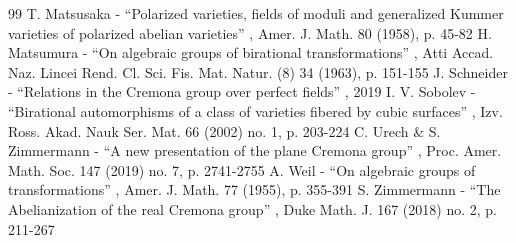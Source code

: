 \documentclass[11pt]{article}
\numberwithin{equation}{section}
\begin{document}
\begin{thebibliography}{99}
 T. Matsusaka - “Polarized varieties, fields of moduli and generalized Kummer varieties of polarized abelian varieties” , Amer. J. Math. 80 (1958), p. 45-82
 H. Matsumura - “On algebraic groups of birational transformations” , Atti Accad. Naz. Lincei Rend. Cl. Sci. Fis. Mat. Natur. (8) 34 (1963), p. 151-155
 J. Schneider - “Relations in the Cremona group over perfect fields” , 2019
 I. V. Sobolev - “Birational automorphisms of a class of varieties fibered by cubic surfaces” , Izv. Ross. Akad. Nauk Ser. Mat. 66 (2002) no. 1, p. 203-224
 C. Urech \& S. Zimmermann - “A new presentation of the plane Cremona group” , Proc. Amer. Math. Soc. 147 (2019) no. 7, p. 2741-2755
 A. Weil - “On algebraic groups of transformations” , Amer. J. Math. 77 (1955), p. 355-391
 S. Zimmermann - “The Abelianization of the real Cremona group” , Duke Math. J. 167 (2018) no. 2, p. 211-267
\end{thebibliography}
\end{document}
